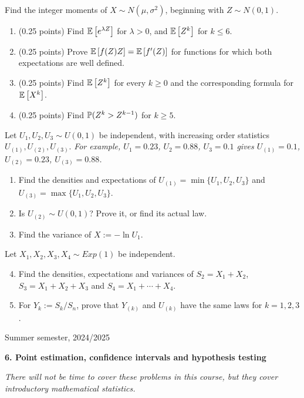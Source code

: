 \documentclass[a4paper]{report}
\begin{document}
\begin{problempencil}[T2, CS 2024]
Find the integer moments of $X\sim N(\mu,\sigma^2)$, beginning with $Z\sim N(0,1)$.
\begin{enumerate}
\item (0.25 points) Find $\Ebb{e^{\lambda Z}}$ for $\lambda>0$, and $\Ebb{Z^k}$ for $k\le6$.
\item (0.25 points) Prove $\Ebb{f(Z)Z}=\Ebb{f'(Z)}$ for functions for which both expectations are well defined.
\item (0.25 points) Find $\Ebb{Z^k}$ for every $k\ge0$ and the corresponding formula for $\Ebb{X^k}$.
\item (0.25 points) Find $\P(Z^k>Z^{k-1})$ for $k\ge5$.
\end{enumerate}
\end{problempencil}
\begin{problempencil}[T2, SE 2023]
Let $U_1,U_2,U_3\sim U(0,1)$ be independent, with increasing order statistics $U_{(1)},U_{(2)},U_{(3)}$. \textit{For example, $U_1=0.23$, $U_2=0.88$, $U_3=0.1$ gives $U_{(1)}=0.1$, $U_{(2)}=0.23$, $U_{(3)}=0.88$.}
\begin{enumerate}
\item Find the densities and expectations of $U_{(1)}=\min\{U_1,U_2,U_3\}$ and $U_{(3)}=\max\{U_1,U_2,U_3\}$.
\item Is $U_{(2)}\sim U(0,1)$? Prove it, or find its actual law.
\item Find the variance of $X:=-\ln U_1$.
\end{enumerate}
Let $X_1,X_2,X_3,X_4\sim Exp(1)$ be independent.
\begin{enumerate}\setcounter{enumi}{3}
\item Find the densities, expectations and variances of $S_2=X_1+X_2$, $S_3=X_1+X_2+X_3$ and $S_4=X_1+\cdots+X_4$.
\item For $Y_k:=S_k/S_n$, prove that $Y_{(k)}$ and $U_{(k)}$ have the same laws for $k=1,2,3$.
\end{enumerate}
\end{problempencil}
\pagebreak
\noindent Summer semester, 2024/2025
\begin{center}\textbf{6. Point estimation, confidence intervals and hypothesis testing}\end{center}
\par\noindent\hrulefill\par
\textit{There will not be time to cover these problems in this course, but they cover introductory mathematical statistics.}
\end{document}
